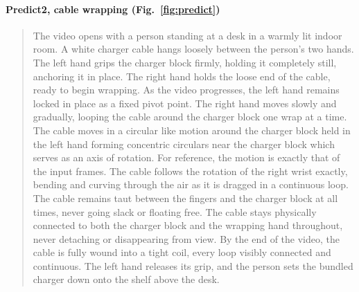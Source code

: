 \paragraph{Predict2, cable wrapping (Fig.~\ref{fig:predict})}
\begin{quote}\small
The video opens with a person standing at a desk in a warmly lit indoor room. A white charger cable hangs loosely between the person's two hands. The left hand grips the charger block firmly, holding it completely still, anchoring it in place. The right hand holds the loose end of the cable, ready to begin wrapping. As the video progresses, the left hand remains locked in place as a fixed pivot point. The right hand moves slowly and gradually, looping the cable around the charger block one wrap at a time. The cable moves in a circular like motion around the charger block held in the left hand forming concentric circulars near the charger block which serves as an axis of rotation. For reference, the motion is exactly that of the input frames. The cable follows the rotation of the right wrist exactly, bending and curving through the air as it is dragged in a continuous loop. The cable remains taut between the fingers and the charger block at all times, never going slack or floating free. The cable stays physically connected to both the charger block and the wrapping hand throughout, never detaching or disappearing from view. By the end of the video, the cable is fully wound into a tight coil, every loop visibly connected and continuous. The left hand releases its grip, and the person sets the bundled charger down onto the shelf above the desk.
\end{quote}
